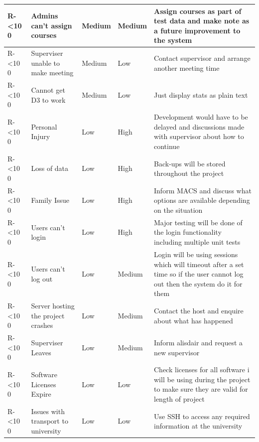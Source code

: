 \documentclass[12pt]{article}  %
\newcommand{\rid}[1]{\centering #1-\ifnum\value{requirement}<10 0\fi\arabic{requirement} \stepcounter{requirement}}
\begin{document}
\begin{spacing}{1.2}
\begin{longtable}{|p{}|p{}|p{}|p{}|p{}|}
\rid{R} & Admins can’t assign courses & Medium & Medium & Assign courses as part of test data and make note as a future improvement to the system  \\ \hline

\rid{R} & Superviser unable to make meeting & Medium & Low & Contact supervisor and arrange another meeting time \\ \hline

\rid{R} & Cannot get D3 to work & Medium & Low & Just display stats as plain text\\ \hline



\rid{R} & Personal Injury & Low & High & Development would have to be delayed and discussions made with supervisor about how to continue\\ \hline

\rid{R} & Loss of data & Low & High & Back-ups will be stored throughout the project\\
\hline

\rid{R} & Family Issue & Low & High  & Inform MACS and discuss what options are available depending on the situation \\ \hline

\rid{R} & Users can't login & Low & High & Major testing will be done of the login functionality including multiple unit tests\\ \hline

\rid{R} & Users can't log out & Low & Medium & Login will be using sessions which will timeout after a set time so if the user cannot log out then the system do it for them\\ \hline

\rid{R} & Server hosting the project crashes & Low & Medium & Contact the host and enquire about what has happened\\ \hline

\rid{R} & Superviser Leaves & Low & Medium & Inform alisdair and request a new supervisor\\ \hline

\rid{R} & Software Licenses Expire & Low & Low & Check licenses for all software i will be using during the project to make sure they are valid for length of project\\ \hline

\rid{R} & Issues with transport to university  & Low & Low & Use SSH to access any required information at the university  \\ \hline

\end{longtable}
\end{spacing}
\end{document}
